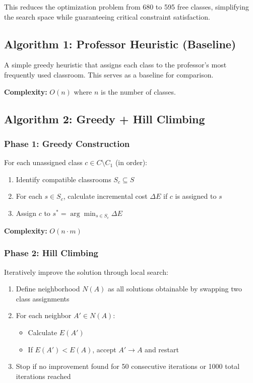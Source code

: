\documentclass[algorithms,article,submit,pdftex,moreauthors]{Definitions/mdpi}
\begin{document}
This reduces the optimization problem from 680 to 595 free classes, simplifying the search space while guaranteeing critical constraint satisfaction.

\subsection{Algorithm 1: Professor Heuristic (Baseline)}

A simple greedy heuristic that assigns each class to the professor's most frequently used classroom. This serves as a baseline for comparison.

\textbf{Complexity:} $O(n)$ where $n$ is the number of classes.

\subsection{Algorithm 2: Greedy + Hill Climbing}

\subsubsection{Phase 1: Greedy Construction}

For each unassigned class $c \in C \setminus C_1$ (in order):
\begin{enumerate}
\item Identify compatible classrooms $S_c \subseteq S$
\item For each $s \in S_c$, calculate incremental cost $\Delta E$ if $c$ is assigned to $s$
\item Assign $c$ to $s^* = \arg\min_{s \in S_c} \Delta E$
\end{enumerate}

\textbf{Complexity:} $O(n \cdot m)$

\subsubsection{Phase 2: Hill Climbing}

Iteratively improve the solution through local search:

\begin{enumerate}
\item Define neighborhood $N(A)$ as all solutions obtainable by swapping two class assignments
\item For each neighbor $A' \in N(A)$:
   \begin{itemize}
   \item Calculate $E(A')$
   \item If $E(A') < E(A)$, accept $A' \rightarrow A$ and restart
   \end{itemize}
\item Stop if no improvement found for 50 consecutive iterations or 1000 total iterations reached
\end{enumerate}
\end{document}
